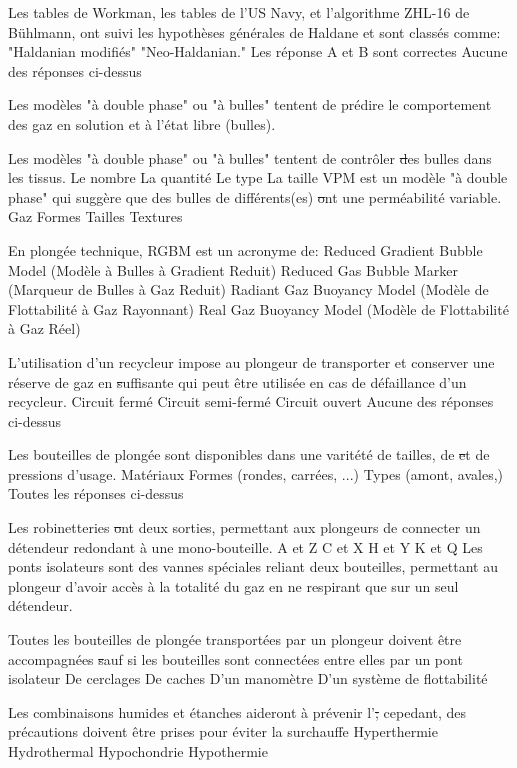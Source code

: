 \documentclass[english,10pt,twoside]{article}
\begin{document}
\begin{outline}
		\1 Les tables de Workman, les tables de l'US Navy, et l'algorithme ZHL-16 de Bühlmann, ont suivi les hypothèses générales de Haldane et sont classés comme:
			\2 "Haldanian modifiés"
			\2 "Neo-Haldanian."
			\2 Les réponse A et B sont correctes
			\2 Aucune des réponses ci-dessus

		\1 Les modèles "à double phase" ou "à bulles" tentent de prédire le comportement des gaz en solution et à l'état libre (bulles).\vf

		\1 Les modèles "à double phase" ou "à bulles" tentent de contrôler \st des bulles dans les tissus.
			\2 Le nombre
			\2 La quantité
			\2 Le type
			\2 La taille
		\1 VPM est un modèle "à double phase" qui suggère que des bulles de différents(es) \st ont une perméabilité variable.
			\2 Gaz
			\2 Formes
			\2 Tailles
			\2 Textures

		\1 En plongée technique, RGBM est un acronyme de:
			\2 Reduced Gradient Bubble Model (Modèle à Bulles à Gradient Reduit)
			\2 Reduced Gas Bubble Marker (Marqueur de Bulles à Gaz Reduit)
			\2 Radiant Gaz Buoyancy Model (Modèle de Flottabilité à Gaz Rayonnant)
			\2 Real Gaz Buoyancy Model (Modèle de Flottabilité à Gaz Réel)

		\1 L'utilisation d'un recycleur impose au plongeur de transporter et conserver une réserve de gaz en \st suffisante qui peut être utilisée en cas de défaillance d'un recycleur.
			\2 Circuit fermé
			\2 Circuit semi-fermé
			\2 Circuit ouvert
			\2 Aucune des réponses ci-dessus

		\1 Les bouteilles de plongée sont disponibles dans une varitété de tailles, de \st et de pressions d'usage.
			\2 Matériaux
			\2 Formes (rondes, carrées, ...)
			\2 Types (amont, avales,)
			\2 Toutes les réponses ci-dessus


		\1 Les robinetteries \st ont deux sorties, permettant aux plongeurs de connecter un détendeur redondant à une mono-bouteille.
			\2 A et Z
			\2 C et X
			\2 H et Y
			\2 K et Q
		\1 Les ponts isolateurs sont des vannes spéciales reliant deux bouteilles, permettant au plongeur d'avoir accès à la totalité du gaz en ne respirant que sur un seul détendeur.\vf

		\1 Toutes les bouteilles de plongée transportées par un plongeur doivent être accompagnées \st sauf si les bouteilles sont connectées entre elles par un pont isolateur
			\2 De cerclages
			\2 De caches
			\2 D'un manomètre
			\2 D'un système de flottabilité

		\1 Les combinaisons humides et étanches aideront à prévenir l'\st; cepedant, des précautions doivent être prises pour éviter la surchauffe
			\2 Hyperthermie
			\2 Hydrothermal
			\2 Hypochondrie
			\2 Hypothermie


\end{outline}
\end{document}
